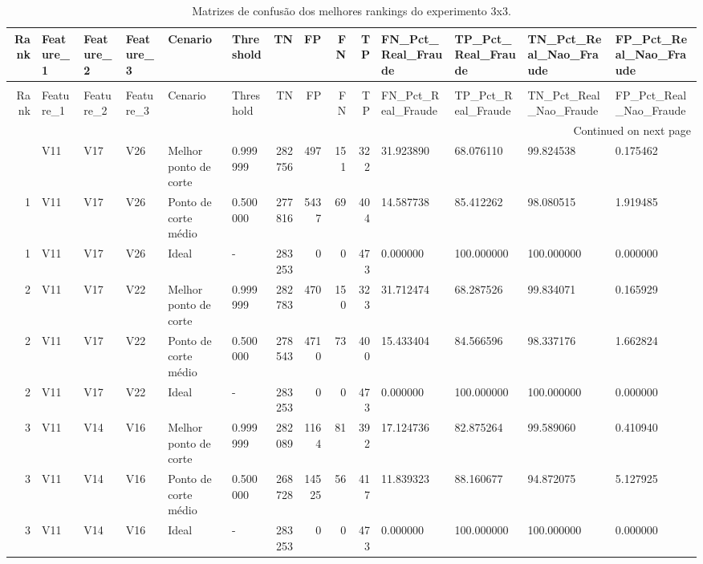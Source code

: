 \begin{longtable}{rlllllrrrrllll}
\caption{Matrizes de confusão dos melhores rankings do experimento 3x3.} \label{tab:matrizes-confusao-ranks-3x3} \\
\toprule
Rank & Feature\_1 & Feature\_2 & Feature\_3 & Cenario & Threshold & TN & FP & FN & TP & FN\_Pct\_Real\_Fraude & TP\_Pct\_Real\_Fraude & TN\_Pct\_Real\_Nao\_Fraude & FP\_Pct\_Real\_Nao\_Fraude \\
\midrule
\endfirsthead
\caption[]{Matrizes de confusão dos melhores rankings do experimento 3x3.} \\
\toprule
Rank & Feature\_1 & Feature\_2 & Feature\_3 & Cenario & Threshold & TN & FP & FN & TP & FN\_Pct\_Real\_Fraude & TP\_Pct\_Real\_Fraude & TN\_Pct\_Real\_Nao\_Fraude & FP\_Pct\_Real\_Nao\_Fraude \\
\midrule
\endhead
\midrule
\multicolumn{14}{r}{Continued on next page} \\
\midrule
\endfoot
\bottomrule
\endlastfoot
1 & V11 & V17 & V26 & Melhor ponto de corte & 0.999999 & 282756 & 497 & 151 & 322 & 31.923890 & 68.076110 & 99.824538 & 0.175462 \\
1 & V11 & V17 & V26 & Ponto de corte médio & 0.500000 & 277816 & 5437 & 69 & 404 & 14.587738 & 85.412262 & 98.080515 & 1.919485 \\
1 & V11 & V17 & V26 & Ideal & - & 283253 & 0 & 0 & 473 & 0.000000 & 100.000000 & 100.000000 & 0.000000 \\
2 & V11 & V17 & V22 & Melhor ponto de corte & 0.999999 & 282783 & 470 & 150 & 323 & 31.712474 & 68.287526 & 99.834071 & 0.165929 \\
2 & V11 & V17 & V22 & Ponto de corte médio & 0.500000 & 278543 & 4710 & 73 & 400 & 15.433404 & 84.566596 & 98.337176 & 1.662824 \\
2 & V11 & V17 & V22 & Ideal & - & 283253 & 0 & 0 & 473 & 0.000000 & 100.000000 & 100.000000 & 0.000000 \\
3 & V11 & V14 & V16 & Melhor ponto de corte & 0.999999 & 282089 & 1164 & 81 & 392 & 17.124736 & 82.875264 & 99.589060 & 0.410940 \\
3 & V11 & V14 & V16 & Ponto de corte médio & 0.500000 & 268728 & 14525 & 56 & 417 & 11.839323 & 88.160677 & 94.872075 & 5.127925 \\
3 & V11 & V14 & V16 & Ideal & - & 283253 & 0 & 0 & 473 & 0.000000 & 100.000000 & 100.000000 & 0.000000 \\
\end{longtable}
